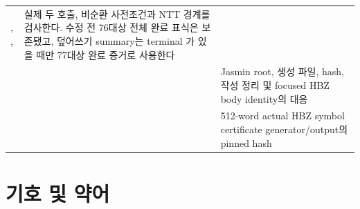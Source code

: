 \begin{longtable}{L{0.29\textwidth}L{0.31\textwidth}L{0.32\textwidth}}
,\newline
{}\newline
{},\newline
{} & 실제 두 호출, 비순환 사전조건과 NTT
경계를 검사한다. 수정 전 76대상 전체 완료 표식은 보존됐고, 덮어쓰기 summary는
terminal 가 있을 때만 77대상 완료 증거로 사용한다 \\
 &  &
Jasmin root, 생성 파일, hash, 작성 정리 및 focused HBZ body identity의 대응 \\
 &
 & 512-word actual HBZ symbol
certificate generator/output의 pinned hash \\
\bottomrule
\end{longtable}
\endgroup

\section{기호 및 약어}

